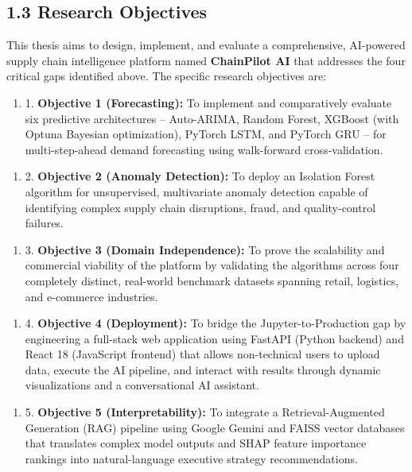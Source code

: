 \documentclass[12pt, a4paper]{report}
\begin{document}
\subsection{1.3 Research Objectives}

This thesis aims to design, implement, and evaluate a comprehensive, AI-powered supply chain intelligence platform named \textbf{ChainPilot AI} that addresses the four critical gaps identified above. The specific research objectives are:

\begin{enumerate}
\item 1. \textbf{Objective 1 (Forecasting):} To implement and comparatively evaluate six predictive architectures -- Auto-ARIMA, Random Forest, XGBoost (with Optuna Bayesian optimization), PyTorch LSTM, and PyTorch GRU -- for multi-step-ahead demand forecasting using walk-forward cross-validation.
\end{enumerate}

\begin{enumerate}
\item 2. \textbf{Objective 2 (Anomaly Detection):} To deploy an Isolation Forest algorithm for unsupervised, multivariate anomaly detection capable of identifying complex supply chain disruptions, fraud, and quality-control failures.
\end{enumerate}

\begin{enumerate}
\item 3. \textbf{Objective 3 (Domain Independence):} To prove the scalability and commercial viability of the platform by validating the algorithms across four completely distinct, real-world benchmark datasets spanning retail, logistics, and e-commerce industries.
\end{enumerate}

\begin{enumerate}
\item 4. \textbf{Objective 4 (Deployment):} To bridge the Jupyter-to-Production gap by engineering a full-stack web application using FastAPI (Python backend) and React 18 (JavaScript frontend) that allows non-technical users to upload data, execute the AI pipeline, and interact with results through dynamic visualizations and a conversational AI assistant.
\end{enumerate}

\begin{enumerate}
\item 5. \textbf{Objective 5 (Interpretability):} To integrate a Retrieval-Augmented Generation (RAG) pipeline using Google Gemini and FAISS vector databases that translates complex model outputs and SHAP feature importance rankings into natural-language executive strategy recommendations.
\end{enumerate}
\end{document}
